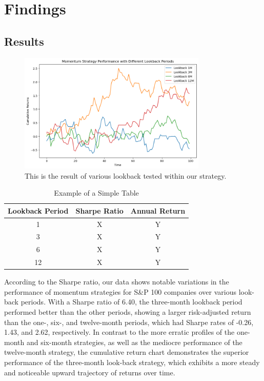 \documentclass[11pt,a4paper,english,oneside]{book}
\begin{document}

\chapter{Findings}
\section{Results}
\begin{figure}[h] %
    \centering
    \includegraphics[width=0.8\textwidth]{Graphics/cum_returns_long_only.png}
    \caption[Cumulative Returns of Analyzed Lookback Periods]{This is the result of various lookback tested within our strategy. }
    \label{fig:my_label}
\end{figure}

\begin{table}[ht]
\centering
\caption{Example of a Simple Table}
\begin{tabular}{|c|c|c|} %
\hline %
\textbf{Lookback Period} & \textbf{Sharpe Ratio} & \textbf{Annual Return} \\ %
\hline
1 & X & Y \\
3 & X & Y \\
6 & X & Y \\
12 & X & Y \\

\hline
\end{tabular}
\end{table}

According to the Sharpe ratio, our data shows notable variations in the performance of momentum strategies for S\&P 100 companies over various look-back periods. With a Sharpe ratio of 6.40, the three-month lookback period performed better than the other periods, showing a larger risk-adjusted return than the one-, six-, and twelve-month periods, which had Sharpe rates of -0.26, 1.43, and 2.62, respectively. In contrast to the more erratic profiles of the one-month and six-month strategies, as well as the mediocre performance of the twelve-month strategy, the cumulative return chart demonstrates the superior performance of the three-month look-back strategy, which exhibits a more steady and noticeable upward trajectory of returns over time.
\end{document}
